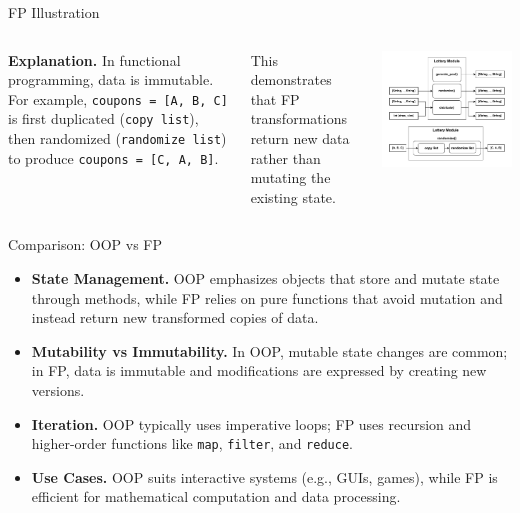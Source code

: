\documentclass[aspectratio=169, table]{beamer}
\begin{document}
\begin{frame}{FP Illustration}
	\vspace{20pt}
	\begin{columns}
		\textbf{Explanation.}  
		In functional programming, data is immutable.  
		For example, \texttt{coupons = [A, B, C]} is first duplicated  
		(\texttt{copy list}), then randomized (\texttt{randomize list})  
		to produce \texttt{coupons = [C, A, B]}.  
		
		\vspace{10pt}
		This demonstrates that FP transformations return new data  
		rather than mutating the existing state.  
		
		\centering
		\includegraphics[width=\textwidth]{../../assets/functional.pdf}
	\end{columns}
\end{frame}

\begin{frame}{Comparison: OOP vs FP}
	\vspace{20pt}
	\begin{itemize}
		\item \textbf{State Management.} OOP emphasizes objects that store and mutate state through methods, while FP relies on pure functions that avoid mutation and instead return new transformed copies of data.  
		\item \textbf{Mutability vs Immutability.} In OOP, mutable state changes are common; in FP, data is immutable and modifications are expressed by creating new versions.  
		\item \textbf{Iteration.} OOP typically uses imperative loops; FP uses recursion and higher-order functions like \texttt{map}, \texttt{filter}, and \texttt{reduce}.  
		\item \textbf{Use Cases.} OOP suits interactive systems (e.g., GUIs, games), while FP is efficient for mathematical computation and data processing.  
	\end{itemize}
\end{frame}
\end{document}
